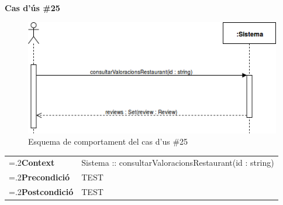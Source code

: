 \clearpage
\noindent\textbf{\large Cas d'ús \#25}\\
\begin{figure}[H]
\centering
\includegraphics[scale=0.6]{Figures/casdus_25.png}
\caption{Esquema de comportament del cas d'us \#25}
\end{figure}
\begin{table}[h]
\noindent
\begin{tabularx}{\linewidth}{
>{\hsize=.2\hsize}X%
>{\hsize=0.8\hsize}X%
}
\textbf{Context} 		& Sistema :: consultarValoracionsRestaurant(id : string) \\
\textbf{Precondició} 	& TEST \\
\textbf{Postcondició}	& TEST \\
\end{tabularx}
\label{}
\end{table}